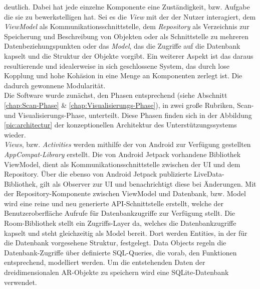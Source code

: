 deutlich. Dabei hat jede einzelne Komponente eine Zuständigkeit, bzw. Aufgabe die sie zu bewerkstelligen hat. Sei es die \textit{View} 
mit der der Nutzer interagiert, dem \textit{ViewModel} als Kommunikationsschnittstelle, dem %
\textit{Repository} als Verzeichnis zur Speicherung und Beschreibung von Objekten oder als Schnittstelle zu mehreren Datenbeziehungspunkten 
oder das \textit{Model}, das die Zugriffe auf die Datenbank kapselt und die Struktur der Objekte vorgibt. %
Ein weiterer Aspekt ist das daraus resultierende und idealerweise in sich geschlossene System, das durch lose Kopplung und hohe Kohäsion in 
eine Menge an Komponenten zerlegt ist. Die dadurch gewonnene Modularität. 
\\ 
\linebreak
Die Software wurde zunächst, den Phasen entsprechend (siehe Abschnitt \ref{chap:Scan-Phase} \& \ref{chap:Visualisierungs-Phase}), in zwei 
große Rubriken, Scan- und Visualisierungs-Phase, unterteilt. Diese Phasen finden sich in der Abbildung \ref{pic:architectur} der 
konzeptionellen Architektur des Unterstützungssystems wieder. 
\\ 
\textit{Views}, bzw. \textit{Activities} werden mithilfe der von Android zur Verfügung gestellten \textit{AppCompat-Library} erstellt. Die 
von Android Jetpack vorhandene Bibliothek ViewModel, dient als Kommunikationsschnittstelle zwischen der \acs{UI} und dem Repository. Über 
die ebenso von Android Jetpack publizierte LiveData-Bibliothek, gilt als Observer zur \acs{UI} und benachrichtigt diese bei Änderungen. Mit 
der Repository-Komponente zwischen ViewModel und Datenbank, bzw. Model wird eine reine und neu generierte \acs{API}-Schnittstelle erstellt, 
welche der Benutzeroberfläche Aufrufe für Datenbankzugriffe zur Verfügung stellt. Die Room-Bibliothek stellt ein Zugriffs-Layer da, welches 
die Datenbankzugriffe kapselt und steht gleichzeitig als Model bereit. Dort werden Entities, in der für die Datenbank vorgesehene 
Struktur, festgelegt. Data Objects regeln die Datenbank-Zugriffe über definierte SQL-Queries, die vorab, den Funktionen entsprechend, 
modelliert werden. Um die entstehenden Daten der dreidimensionalen \acs{AR}-Objekte zu speichern wird eine SQLite-Datenbank verwendet.

